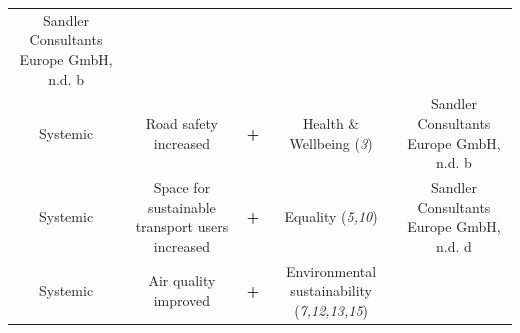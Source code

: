 \documentclass[
]{book}
\begin{document}
\begin{longtable}[]{@{}ccccc@{}}
\begin{minipage}[t]{0.17\columnwidth}
Sandler Consultants Europe GmbH, n.d. b\strut
\end{minipage}\tabularnewline
\begin{minipage}[t]{0.17\columnwidth}\centering
Systemic\strut
\end{minipage} & \begin{minipage}[t]{0.16\columnwidth}\centering
Road safety increased\strut
\end{minipage} & \begin{minipage}[t]{0.17\columnwidth}\centering
\textbf{+}\strut
\end{minipage} & \begin{minipage}[t]{0.17\columnwidth}\centering
Health \& Wellbeing (\emph{3})\strut
\end{minipage} & \begin{minipage}[t]{0.17\columnwidth}\centering
Sandler Consultants Europe GmbH, n.d. b\strut
\end{minipage}\tabularnewline
\begin{minipage}[t]{0.17\columnwidth}\centering
Systemic\strut
\end{minipage} & \begin{minipage}[t]{0.16\columnwidth}\centering
Space for sustainable transport users increased\strut
\end{minipage} & \begin{minipage}[t]{0.17\columnwidth}\centering
\textbf{+}\strut
\end{minipage} & \begin{minipage}[t]{0.17\columnwidth}\centering
Equality (\emph{5,10})\strut
\end{minipage} & \begin{minipage}[t]{0.17\columnwidth}\centering
Sandler Consultants Europe GmbH, n.d. d\strut
\end{minipage}\tabularnewline
\begin{minipage}[t]{0.17\columnwidth}\centering
Systemic\strut
\end{minipage} & \begin{minipage}[t]{0.16\columnwidth}\centering
Air quality improved\strut
\end{minipage} & \begin{minipage}[t]{0.17\columnwidth}\centering
\textbf{+}\strut
\end{minipage} & \begin{minipage}[t]{0.17\columnwidth}\centering
Environmental sustainability (\emph{7,12,13,15})\strut
\end{minipage} & \begin{minipage}[t]{0.17\columnwidth}\centering

\end{minipage}
\end{longtable}
\end{document}
